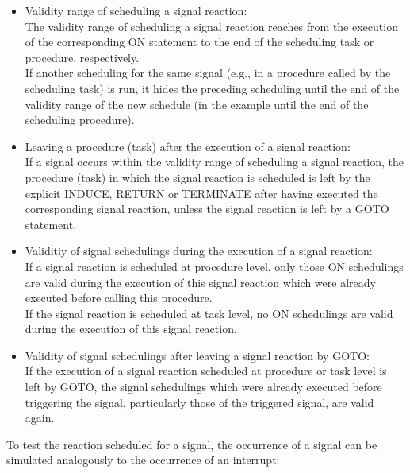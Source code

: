 \begin{itemize}
\item Validity range of scheduling a signal reaction:\\
The validity range of scheduling a signal reaction reaches from the
execution of the corresponding ON statement to the end of the
scheduling task or procedure, respectively.\\
If another scheduling for the same signal (e.g., in a procedure called
by the scheduling task) is run, it hides the preceding scheduling until
the end of the validity range of the new schedule (in the example until
the end of the scheduling procedure).
\item Leaving a procedure (task) after the execution of a signal
reaction:\\
If a signal occurs within the validity range of scheduling a signal
reaction, the procedure (task) in which the signal reaction is scheduled
is left by 
the explicit INDUCE, RETURN or TERMINATE
 after having executed the 
corresponding signal reaction, unless the signal reaction is left by a 
GOTO statement.
\item Validitiy of signal schedulings during the execution of a signal
reaction:\\
If a signal reaction is scheduled at procedure level, only those ON
schedulings are valid during the execution of this signal reaction which
were already executed before calling this procedure.\\
If the signal reaction is scheduled at task level, no ON schedulings are
valid during the execution of this signal reaction.
\item Validity of signal schedulings after leaving a signal reaction by
GOTO:\\
If the execution of a signal reaction scheduled at procedure or task
level is left by GOTO, the signal schedulings which were already
executed before triggering the signal, particularly those of the
triggered signal, are valid again.
\end{itemize}

To test the reaction scheduled for a signal, the occurrence of a signal
can be simulated analogously to the occurrence of an interrupt:





